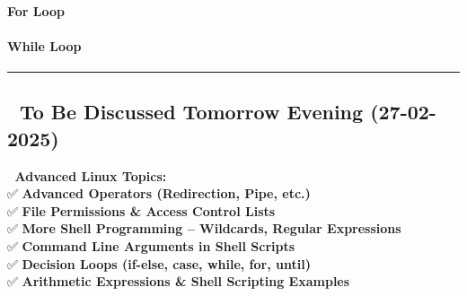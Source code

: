 \documentclass[
]{article}
\newenvironment{Shaded}{}{}
\newcommand{\BuiltInTok}[1]{\textcolor[rgb]{0.00,0.50,0.00}{#1}}
\newcommand{\ControlFlowTok}[1]{\textcolor[rgb]{0.00,0.44,0.13}{\textbf{#1}}}
\newcommand{\DecValTok}[1]{\textcolor[rgb]{0.25,0.63,0.44}{#1}}
\newcommand{\KeywordTok}[1]{\textcolor[rgb]{0.00,0.44,0.13}{\textbf{#1}}}
\newcommand{\NormalTok}[1]{#1}
\newcommand{\OperatorTok}[1]{\textcolor[rgb]{0.40,0.40,0.40}{#1}}
\newcommand{\OtherTok}[1]{\textcolor[rgb]{0.00,0.44,0.13}{#1}}
\newcommand{\StringTok}[1]{\textcolor[rgb]{0.25,0.44,0.63}{#1}}
\newcommand{\VariableTok}[1]{\textcolor[rgb]{0.10,0.09,0.49}{#1}}
\begin{document}
\paragraph{\texorpdfstring{\textbf{For Loop}}{For Loop}}\label{for-loop}

\begin{Shaded}
\end{Shaded}

\paragraph{\texorpdfstring{\textbf{While
Loop}}{While Loop}}\label{while-loop}

\begin{Shaded}
\end{Shaded}

\begin{center}\rule{0.5\linewidth}{0.5pt}\end{center}

\subsection{\texorpdfstring{\textbf{📌 To Be Discussed Tomorrow Evening
(27-02-2025)}}{📌 To Be Discussed Tomorrow Evening (27-02-2025)}}\label{to-be-discussed-tomorrow-evening-27-02-2025}

📌 \textbf{Advanced Linux Topics:}\\
✅ \textbf{Advanced Operators (Redirection, Pipe, etc.)}\\
✅ \textbf{File Permissions \& Access Control Lists}\\
✅ \textbf{More Shell Programming -- Wildcards, Regular Expressions}\\
✅ \textbf{Command Line Arguments in Shell Scripts}\\
✅ \textbf{Decision Loops (if-else, case, while, for, until)}\\
✅ \textbf{Arithmetic Expressions \& Shell Scripting Examples}
\end{document}
